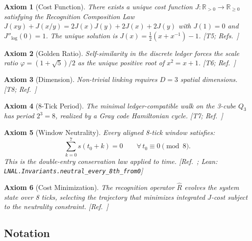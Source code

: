 \documentclass[11pt, a4paper]{article}
\newcommand{\Rhat}{\hat{R}}
\newcommand{\leanref}[1]{\texttt{\small #1}}
\newtheorem{axiom_rs}{Axiom}
\theoremstyle{definition}
\theoremstyle{remark}
\begin{document}
\begin{axiom_rs}[Cost Function]\label{ax:cost}
There exists a unique cost function $J : \mathbb{R}_{>0} \to
\mathbb{R}_{\geq 0}$ satisfying the Recognition Composition Law
$J(xy) + J(x/y) = 2J(x)J(y) + 2J(x) + 2J(y)$ with $J(1) = 0$ and
$J''_{\log}(0) = 1$. The unique solution is
$J(x) = \tfrac{1}{2}(x + x^{-1}) - 1$.
\textup{[T5; Refs.~\cite{RSCost2025,RSdalembert2026}]}
\end{axiom_rs}

\begin{axiom_rs}[Golden Ratio]\label{ax:phi}
Self-similarity in the discrete ledger forces the scale ratio
$\varphi = (1 + \sqrt{5})/2$ as the unique positive root of
$x^2 = x + 1$.
\textup{[T6; Ref.~\cite{RSAxioms2025}]}
\end{axiom_rs}

\begin{axiom_rs}[Dimension]\label{ax:dim}
Non-trivial linking requires $D = 3$ spatial dimensions.
\textup{[T8; Ref.~\cite{RSGeometry2025}]}
\end{axiom_rs}

\begin{axiom_rs}[8-Tick Period]\label{ax:8tick}
The minimal ledger-compatible walk on the 3-cube $Q_3$ has period
$2^3 = 8$, realized by a Gray code Hamiltonian cycle.
\textup{[T7; Ref.~\cite{RSAxioms2025}]}
\end{axiom_rs}

\begin{axiom_rs}[Window Neutrality]\label{ax:neutral}
Every aligned 8-tick window satisfies:
\begin{equation}\label{eq:neutrality}
    \sum_{k=0}^{7} s(t_0 + k) = 0 \qquad
    \forall\, t_0 \equiv 0 \pmod{8}.
\end{equation}
This is the double-entry conservation law applied to time.
\textup{[Ref.~\cite{RSAxioms2025}; Lean:
\leanref{LNAL.Invariants.neutral\_every\_8th\_from0}]}
\end{axiom_rs}

\begin{axiom_rs}[Cost Minimization]\label{ax:rhat}
The recognition operator $\Rhat$ evolves the system state over
8 ticks, selecting the trajectory that minimizes integrated $J$-cost
subject to the neutrality constraint.
\textup{[Ref.~\cite{RSAxioms2025}]}
\end{axiom_rs}

\subsection{Notation}
\end{document}

